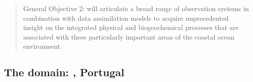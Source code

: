 \begin{quote} 
  \textsf{General Objective 2:} \proj will articulate a broad range of
  observation systems in combination with data assimilation models to
  acquire unprecedented insight on the integrated physical and
  biogeochemical processes that are associated with these particularly
  important areas of the coastal ocean environment.
\end{quote} 

\subsection{The domain: \naze, Portugal}
\label{sec:naz}

\begin{figure}[!b]
  \vspace{-0.5cm} 
  \centering 
  \hspace{+0.3cm} 

\end{figure}
